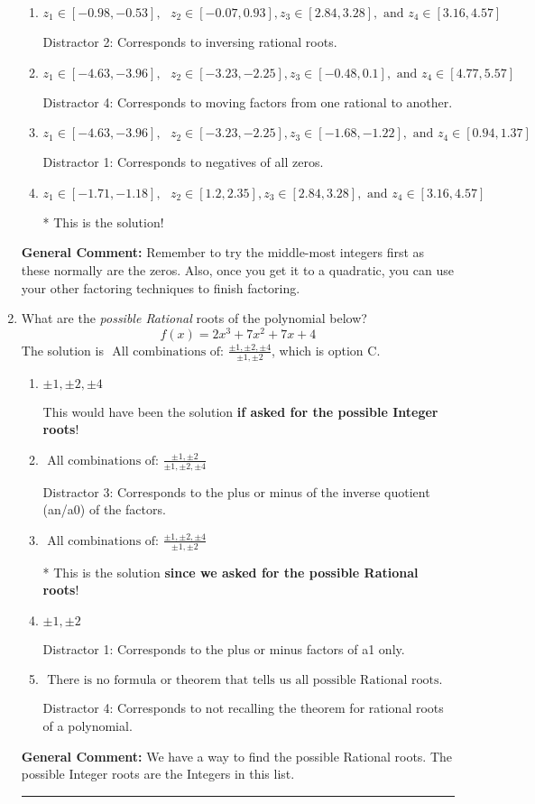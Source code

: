 \documentclass{extbook}[14pt]
\newcommand{\litem}[1]{\item #1

\rule{\textwidth}{0.4pt}}
\begin{document}
\begin{enumerate}
{\begin{enumerate}[label=\Alph*.]
 Distractor 3: Corresponds to negatives of all zeros AND inversing rational roots.
\item \( z_1 \in [-0.98, -0.53], \text{   }  z_2 \in [-0.07, 0.93], z_3 \in [2.84, 3.28], \text{   and   } z_4 \in [3.16, 4.57] \)

 Distractor 2: Corresponds to inversing rational roots.
\item \( z_1 \in [-4.63, -3.96], \text{   }  z_2 \in [-3.23, -2.25], z_3 \in [-0.48, 0.1], \text{   and   } z_4 \in [4.77, 5.57] \)

 Distractor 4: Corresponds to moving factors from one rational to another.
\item \( z_1 \in [-4.63, -3.96], \text{   }  z_2 \in [-3.23, -2.25], z_3 \in [-1.68, -1.22], \text{   and   } z_4 \in [0.94, 1.37] \)

 Distractor 1: Corresponds to negatives of all zeros.
\item \( z_1 \in [-1.71, -1.18], \text{   }  z_2 \in [1.2, 2.35], z_3 \in [2.84, 3.28], \text{   and   } z_4 \in [3.16, 4.57] \)

* This is the solution!
\end{enumerate}

\textbf{General Comment:} Remember to try the middle-most integers first as these normally are the zeros. Also, once you get it to a quadratic, you can use your other factoring techniques to finish factoring.
}
\litem{
What are the \textit{possible Rational} roots of the polynomial below?
\[ f(x) = 2x^{3} +7 x^{2} +7 x + 4 \]The solution is \( \text{ All combinations of: }\frac{\pm 1,\pm 2,\pm 4}{\pm 1,\pm 2} \), which is option C.\begin{enumerate}[label=\Alph*.]
\item \( \pm 1,\pm 2,\pm 4 \)

This would have been the solution \textbf{if asked for the possible Integer roots}!
\item \( \text{ All combinations of: }\frac{\pm 1,\pm 2}{\pm 1,\pm 2,\pm 4} \)

 Distractor 3: Corresponds to the plus or minus of the inverse quotient (an/a0) of the factors. 
\item \( \text{ All combinations of: }\frac{\pm 1,\pm 2,\pm 4}{\pm 1,\pm 2} \)

* This is the solution \textbf{since we asked for the possible Rational roots}!
\item \( \pm 1,\pm 2 \)

 Distractor 1: Corresponds to the plus or minus factors of a1 only.
\item \( \text{ There is no formula or theorem that tells us all possible Rational roots.} \)

 Distractor 4: Corresponds to not recalling the theorem for rational roots of a polynomial.
\end{enumerate}

\textbf{General Comment:} We have a way to find the possible Rational roots. The possible Integer roots are the Integers in this list.
}
\end{enumerate}
\end{document}
